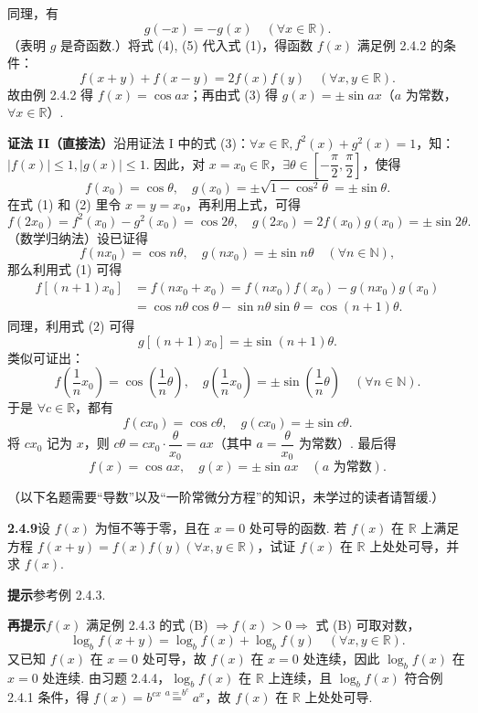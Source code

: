 \documentclass[UTF8, 12pt, fontset=fandol, oneside]{ctexart}
\begin{document}
同理，有
\[
  g(-x)=-g(x)\quad(\forall x\in\mathbb{R}). \tag{5}
\]
（表明 $g$ 是奇函数.）将式 (4), (5) 代入式 (1)，得函数 $f(x)$ 满足例 2.4.2 的条件：
\[
  f(x+y)+f(x-y)=2f(x)f(y)\quad(\forall x,y\in\mathbb{R}).
\]
故由例 2.4.2 得 $f(x)=\cos ax$；再由式 (3) 得 $g(x)=\pm\sin ax$（$a$ 为常数，$\forall x\in\mathbb{R}$）.

\noindent\textbf{证法 II（直接法）}\quad 沿用证法 I 中的式 (3)：$\forall x\in\mathbb{R},f^2(x)+g^2(x)=1$，知：$|f(x)|\le1,|g(x)|\le1$. 因此，对 $x=x_0\in\mathbb{R}$，$\exists\theta\in\left[-\dfrac\pi2,\dfrac\pi2\right]$，使得
\[
  f(x_0)=\cos\theta,\quad g(x_0)=\pm\sqrt{1-\cos^2\theta}=\pm\sin\theta.
\]
在式 (1) 和 (2) 里令 $x=y=x_0$，再利用上式，可得
\[
  f(2x_0)=f^2(x_0)-g^2(x_0)=\cos2\theta,\quad
  g(2x_0)=2f(x_0)g(x_0)=\pm\sin2\theta. \tag{6}
\]
（数学归纳法）设已证得
\[
  f(nx_0)=\cos n\theta,\quad g(nx_0)=\pm\sin n\theta\quad(\forall n\in\mathbb{N}),
\]
那么利用式 (1) 可得
\[
\begin{aligned}
f[(n+1)x_0]
&=f(nx_0+x_0)=f(nx_0)f(x_0)-g(nx_0)g(x_0)\\
&=\cos n\theta\cos\theta-\sin n\theta\sin\theta=\cos(n+1)\theta.
\end{aligned}
\]
同理，利用式 (2) 可得
\[
  g[(n+1)x_0]=\pm\sin(n+1)\theta.
\]
类似可证出：
\[
  f\left(\frac1n x_0\right)=\cos\left(\frac1n\theta\right),\quad
  g\left(\frac1n x_0\right)=\pm\sin\left(\frac1n\theta\right)\quad(\forall n\in\mathbb{N}).
\]
于是 $\forall c\in\mathbb{R}$，都有
\[
  f(cx_0)=\cos c\theta,\quad g(cx_0)=\pm\sin c\theta.
\]
将 $cx_0$ 记为 $x$，则 $c\theta=cx_0\cdot\dfrac{\theta}{x_0}=ax$（其中 $a=\dfrac{\theta}{x_0}$ 为常数）. 最后得
\[
  f(x)=\cos ax,\quad g(x)=\pm\sin ax\quad(a\text{ 为常数}).
\]

\noindent（以下名题需要“导数”以及“一阶常微分方程”的知识，未学过的读者请暂缓.）

\noindent\textbf{2.4.9}\quad 设 $f(x)$ 为恒不等于零，且在 $x=0$ 处可导的函数. 若 $f(x)$ 在 $\mathbb{R}$ 上满足方程 $f(x+y)=f(x)f(y)(\forall x,y\in\mathbb{R})$，试证 $f(x)$ 在 $\mathbb{R}$ 上处处可导，并求 $f(x)$.

\noindent\textbf{提示}\quad 参考例 2.4.3.

\noindent\textbf{再提示}\quad $f(x)$ 满足例 2.4.3 的式 (B) $\Rightarrow f(x)>0\Rightarrow$ 式 (B) 可取对数，
\[
  \log_b f(x+y)=\log_b f(x)+\log_b f(y)\quad(\forall x,y\in\mathbb{R}).
\]
又已知 $f(x)$ 在 $x=0$ 处可导，故 $f(x)$ 在 $x=0$ 处连续，因此 $\log_b f(x)$ 在 $x=0$ 处连续. 由习题 2.4.4，$\log_b f(x)$ 在 $\mathbb{R}$ 上连续，且 $\log_b f(x)$ 符合例 2.4.1 条件，得 $f(x)=b^{cx}\overset{a=b^c}{=}a^x$，故 $f(x)$ 在 $\mathbb{R}$ 上处处可导.
\end{document}
